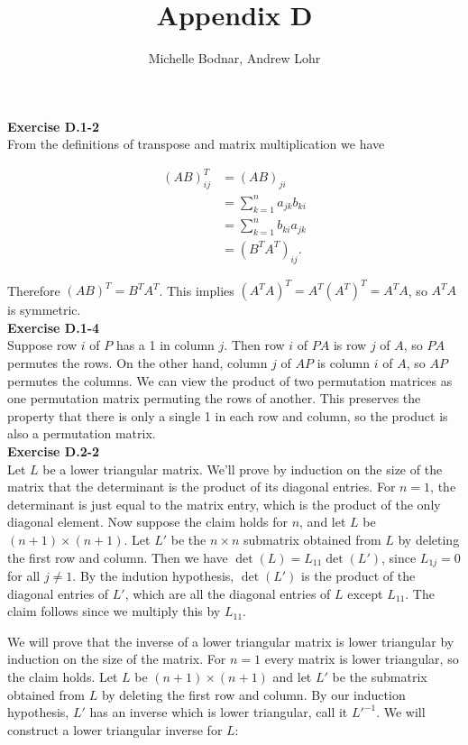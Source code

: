 \documentclass{article}
\title{Appendix D}
\author{Michelle Bodnar, Andrew Lohr}
\begin{document}
\maketitle

\noindent\textbf{Exercise D.1-2}\\

From the definitions of transpose and matrix multiplication we have

\begin{align*}
(AB)^T_{ij} &= (AB)_{ji} \\
&= \sum_{k=1}^n a_{jk}b_{ki}\\
&= \sum_{k=1}^n b_{ki}a_{jk}\\
&= (B^TA^T)_{ij}.
\end{align*}

Therefore $(AB)^T = B^TA^T$.  This implies $(A^TA)^T = A^T(A^T)^T = A^TA$, so $A^TA$ is symmetric. \\

\noindent\textbf{Exercise D.1-4}\\

Suppose row $i$ of $P$ has a 1 in column $j$.  Then row $i$ of $PA$ is row $j$ of $A$, so $PA$ permutes the rows.  On the other hand, column $j$ of $AP$ is column $i$ of $A$, so $AP$ permutes the columns.  We can view the product of two permutation matrices as one permutation matrix permuting the rows of another.  This preserves the property that there is only a single 1 in each row and column, so the product is also a permutation matrix. \\

\noindent\textbf{Exercise D.2-2}\\

Let $L$ be a lower triangular matrix.  We'll prove by induction on the size of the matrix that the determinant is the product of its diagonal entries. For $n=1$, the determinant is just equal to the matrix entry, which is the product of the only diagonal element.  Now suppose the claim holds for $n$, and let $L$ be $(n+1) \times (n+1)$.  Let $L'$ be the $n \times n$ submatrix obtained from $L$ by deleting the first row and column.  Then we have $\det(L) = L_{11} \det(L')$, since $L_{1j} = 0$ for all $j \neq 1$.  By the indution hypothesis, $\det(L')$ is the product of the diagonal entries of $L'$, which are all the diagonal entries of $L$ except $L_{11}$.  The claim follows since we multiply this by $L_{11}$.  

We will prove that the inverse of a lower triangular matrix is lower triangular by induction on the size of the matrix.  For $n=1$ every matrix is lower triangular, so the claim holds.  Let $L$ be $(n+1) \times (n+1)$ and let $L'$ be the submatrix obtained from $L$ by deleting the first row and column.  By our induction hypothesis, $L'$ has an inverse which is lower triangular, call it $L'^{-1}$.  We will construct a lower triangular inverse for $L$:
\end{document}
